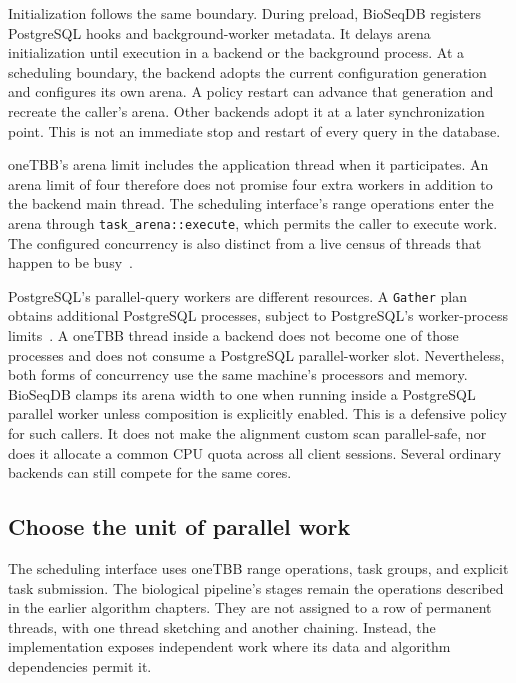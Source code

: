 Initialization follows the same boundary. During preload, BioSeqDB
registers PostgreSQL hooks and background-worker metadata. It delays arena
initialization until execution in a backend or the background process.
At a scheduling boundary, the backend adopts the current configuration
generation and configures its own arena. A policy restart can advance that
generation and recreate the caller's arena. Other backends adopt it at a
later synchronization point. This is not an immediate stop and restart of
every query in the database.

oneTBB's arena limit includes the application thread when it participates.
An arena limit of four therefore does not promise four extra workers in
addition to the backend main thread. The scheduling interface's range operations enter
the arena through \texttt{task\_arena::execute}, which permits the caller
to execute work. The configured concurrency is also distinct from a live
census of threads that happen to be busy~\autocite{onetbbTaskArena}.

PostgreSQL's parallel-query workers are different resources. A
\texttt{Gather} plan obtains additional PostgreSQL processes, subject to
PostgreSQL's worker-process limits~\autocite{postgresql17_parallel_resources}.
A oneTBB thread inside a backend does not become one of those processes and
does not consume a PostgreSQL parallel-worker slot. Nevertheless, both
forms of concurrency use the same machine's processors and memory.
BioSeqDB clamps its arena width to one when running inside a PostgreSQL
parallel worker unless composition is explicitly enabled. This is a
defensive policy for such callers. It does not make the alignment custom
scan parallel-safe, nor does it allocate a common CPU quota across all
client sessions. Several ordinary backends can still compete for the same
cores.

\subsection{Choose the unit of parallel work}
\label{sec:arch-work-distribution}

The scheduling interface uses oneTBB range operations, task groups, and
explicit task submission. The biological pipeline's stages remain the
operations described in the earlier algorithm chapters. They are not
assigned to a row of permanent threads, with one thread sketching and
another chaining. Instead, the implementation exposes independent work
where its data and algorithm dependencies permit it.

